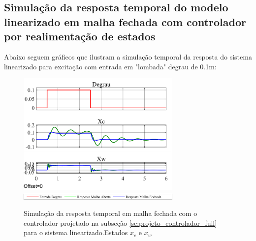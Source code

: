 \documentclass[a4paper]{ifacconf}
\begin{document}
    \subsection{Simulação da resposta temporal do modelo linearizado em malha fechada com controlador por realimentação de estados}
    
    Abaixo seguem gráficos que ilustram a simulação temporal da resposta do sistema linearizado para excitação com entrada em "lombada" degrau de 0.1m:
    \FloatBarrier
    \begin{figure}[htbp]
        \begin{centering}
            \includegraphics[width=8cm]{img/simulaca_temporal_linear_realimentacao.png}
            \includegraphics[width=8cm]{img/sim_linear_simulink_temp_leg.png}
            \caption{Simulação da resposta temporal em malha fechada com o controlador projetado na subseção \ref{sc:projeto_controlador_full} para o sistema linearizado.Estados $x_c$ e $x_w$ }
            \label{fig:simulaca_temporal_linear_realimentacao}
        \end{centering}
    \end{figure}
    \FloatBarrier
	
\end{document}
